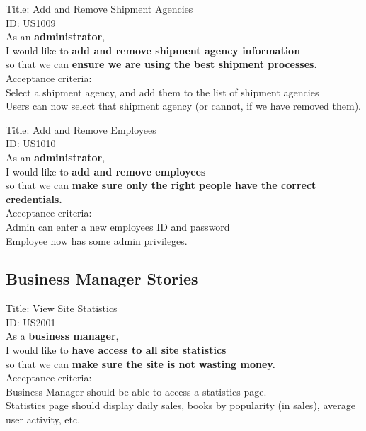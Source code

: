 \documentclass{article}
\begin{document}
\begin{framed}
\noindent
Title: Add and Remove Shipment Agencies\\
ID: US1009 \\
As an \textbf{administrator},\\
 \textbullet  \quad \quad I would like to \textbf{add and remove shipment agency information}\\ 
 \textbullet  \quad \quad so that we can \textbf{ensure we are using the best shipment processes.}\\
 Acceptance criteria: \\
  \textbullet  \quad \quad Select a shipment agency, and add them to the list of shipment agencies\\
  \textbullet  \quad \quad Users can now select that shipment agency (or cannot, if we have removed them).
\end{framed}


\begin{framed}
\noindent
Title: Add and Remove Employees\\
ID: US1010 \\
As an \textbf{administrator},\\
 \textbullet  \quad \quad I would like to \textbf{add and remove employees}\\ 
 \textbullet  \quad \quad so that we can \textbf{make sure only the right people have the correct credentials.}\\
 Acceptance criteria: \\
  \textbullet  \quad \quad Admin can enter a new employees ID and password\\
  \textbullet  \quad \quad Employee now has some admin privileges.
\end{framed}

\subsection{Business Manager Stories}

\begin{framed}
\noindent
Title: View Site Statistics \\
ID: US2001 \\
As a \textbf{business manager},\\
 \textbullet  \quad \quad I would like to \textbf{have access to all site statistics}\\ 
 \textbullet  \quad \quad so that we can \textbf{make sure the site is not wasting money.}\\
 Acceptance criteria: \\
  \textbullet  \quad \quad Business Manager should be able to access a statistics page.\\
  \textbullet  \quad \quad Statistics page should display daily sales, books by popularity (in sales), average user activity, etc.\\
\end{framed}
\end{document}
